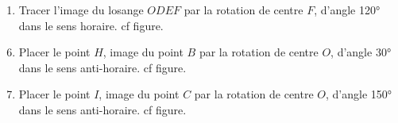 \begin{corrige}
\begin{enumerate}
        \item Tracer l'image du losange $ODEF$ par la rotation de centre $F$, d'angle \ang{120} dans le sens horaire. {\red cf figure.}
    \end{enumerate}
    \Coupe
    \begin{enumerate}
        \setcounter{enumi}{5}
        \item Placer le point $H$, image du point $B$ par la rotation de centre $O$, d'angle \ang{30} dans le sens anti-horaire. {\red cf figure.}
        \item Placer le point $I$, image du point $C$ par la rotation de centre $O$, d'angle \ang{150} dans le sens anti-horaire. {\red cf figure.}
    \end{enumerate}
\end{corrige}

